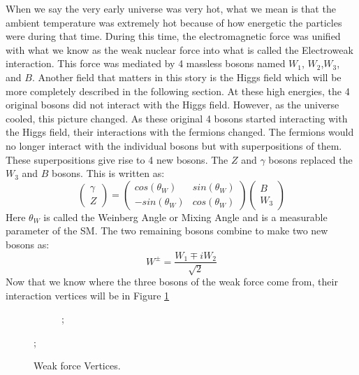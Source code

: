When we say the very early universe was very hot, what we mean is that the ambient temperature was extremely hot because of how energetic the particles were during that time.
During this time, the electromagnetic force was unified with what we know as the weak nuclear force into what is called the Electroweak interaction. This force was mediated by 4 massless bosons named $W_1$, $W_2$,$W_3$, and $B$. 
Another field that matters in this story is the Higgs field which will be more completely described in the following section. At these high energies, the 4 original bosons did not interact with the Higgs field. However, as the universe cooled, this picture changed.
As these original 4 bosons started interacting with the Higgs field, their interactions with the fermions changed. The fermions would no longer interact with the individual bosons but with superpositions of them. These superpositions give rise to 4 new bosons.
The $Z$ and $\gamma$ bosons replaced the $W_3$ and $B$ bosons. This is written as:
\begin{equation}
   \begin{pmatrix} \gamma \\ Z \end{pmatrix}
   = \begin{pmatrix} cos(\theta_{W}) & sin(\theta_{W}) \\
      -sin(\theta_{W}) & cos(\theta_{W})
   \end{pmatrix}
   \begin{pmatrix} B \\ W_3 \end{pmatrix}
\end{equation}
Here $\theta_{W}$ is called the Weinberg Angle or Mixing Angle and is a measurable parameter of the SM. The two remaining bosons combine to make two new bosons as:
\begin{equation}
   W^{\pm} = \frac{W_1 \mp i W_2}{\sqrt{2}}
\end{equation}
Now that we know where the three bosons of the weak force come from, their interaction vertices will be in Figure \ref{fig:fig_1-7}
\begin{figure} %
   \centering
   \begin{subfigure}[t]{0.49\textwidth}
      ;
   \end{subfigure}
   ;
   \caption{Weak force Vertices.}
   \label{fig:fig_1-7}
\end{figure}
